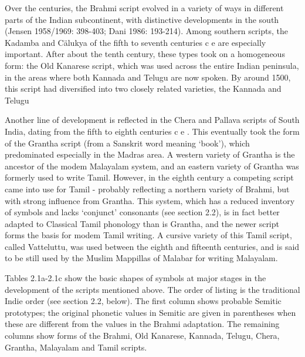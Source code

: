 Over the centuries, the Brahmi script evolved in a variety of ways in different
parts of the Indian subcontinent, with distinctive developments in the south
(Jensen 1958/1969: 398-403; Dani 1986: 193-214). Among southern scripts, the
Kadamba and Cälukya of the fifth to seventh centuries c e are especially important.
After about the tenth century, these types took on a homogeneous form: the
Old Kanarese script, which was used across the entire Indian peninsula, in the
areas where both Kannada and Telugu are now spoken. By around 1500, this
script had diversified into two closely related varieties, the Kannada and Telugu

Another line of development is reflected in the Chera and Pallava scripts of
South India, dating from the fifth to eighth centuries c e . This eventually took the
form of the Grantha script (from a Sanskrit word meaning ‘book’), which predominated
especially in the Madras area. A western variety of Grantha is the
ancestor of the modem Malayalam system, and an eastern variety of Grantha
was formerly used to write Tamil. However, in the eighth century a competing
script came into use for Tamil - probably reflecting a northern variety of Brahmi,
but with strong influence from Grantha. This system, which has a reduced inventory
of symbols and lacks ‘conjunct’ consonants (see section 2.2), is in fact
better adapted to Classical Tamil phonology than is Grantha, and the newer
script forms the basis for modem Tamil writing. A cursive variety of this Tamil
script, called Vatteluttu, was used between the eighth and fifteenth centuries,
and is said to be still used by the Muslim Mappillas of Malabar for writing
Malayalam.


Tables 2.1a-2.1c show the basic shapes of symbols at major stages in the development
of the scripts mentioned above. The order of listing is the traditional
Indie order (see section 2.2, below). The first column shows probable Semitic
prototypes; the original phonetic values in Semitic are given in parentheses
when these are different from the values in the Brahmi adaptation. The remaining
columns show forms of the Brahmi, Old Kanarese, Kannada, Telugu, Chera,
Grantha, Malayalam and Tamil scripts.

